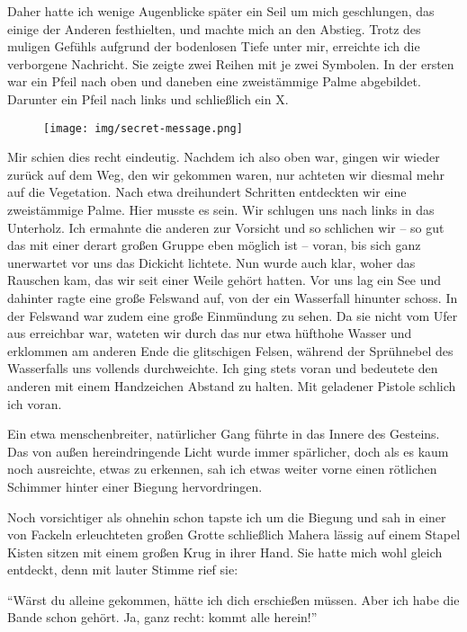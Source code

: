Daher hatte ich wenige Augenblicke später ein Seil um mich geschlungen, das einige der Anderen festhielten, und machte mich an den Abstieg. Trotz des muligen Gefühls aufgrund der bodenlosen Tiefe unter mir, erreichte ich die verborgene Nachricht. Sie zeigte zwei Reihen mit je zwei Symbolen. In der ersten war ein Pfeil nach oben und daneben eine zweistämmige Palme abgebildet. Darunter ein Pfeil nach links und schließlich ein X.

\vspace{0.5cm}\noindent
\begin{figure}[!ht]
\centering
\texttt{[image: img/secret-message.png]}
\end{figure}

Mir schien dies recht eindeutig. Nachdem ich also oben war, gingen wir wieder zurück auf dem Weg, den wir gekommen waren, nur achteten wir diesmal mehr auf die Vegetation. Nach etwa dreihundert Schritten entdeckten wir eine zweistämmige Palme. Hier musste es sein. Wir schlugen uns nach links in das Unterholz. Ich ermahnte die anderen zur Vorsicht und so schlichen wir -- so gut das mit einer derart großen Gruppe eben möglich ist -- voran, bis sich ganz unerwartet vor uns das Dickicht lichtete. Nun wurde auch klar, woher das Rauschen kam, das wir seit einer Weile gehört hatten. Vor uns lag ein See und dahinter ragte eine große Felswand auf, von der ein Wasserfall hinunter schoss. In der Felswand war zudem eine große Einmündung zu sehen. Da sie nicht vom Ufer aus erreichbar war, wateten wir durch das nur etwa hüfthohe Wasser und erklommen am anderen Ende die glitschigen Felsen, während der Sprühnebel des Wasserfalls uns vollends durchweichte. Ich ging stets voran und bedeutete den anderen mit einem Handzeichen Abstand zu halten. Mit geladener Pistole schlich ich voran.

Ein etwa menschenbreiter, natürlicher Gang führte in das Innere des Gesteins. Das von außen hereindringende Licht wurde immer spärlicher, doch als es kaum noch ausreichte, etwas zu erkennen, sah ich etwas weiter vorne einen rötlichen Schimmer hinter einer Biegung hervordringen.

Noch vorsichtiger als ohnehin schon tapste ich um die Biegung und sah in einer von Fackeln erleuchteten großen Grotte schließlich Mahera lässig auf einem Stapel Kisten sitzen mit einem großen Krug in ihrer Hand. Sie hatte mich wohl gleich entdeckt, denn mit lauter Stimme rief sie:

\enquote{Wärst du alleine gekommen, hätte ich dich erschießen müssen. Aber ich habe die Bande schon gehört. Ja, ganz recht: kommt alle herein!}

